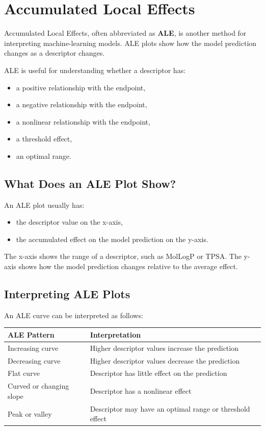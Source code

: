 \documentclass[11pt]{report}
\newenvironment{Important note}{\begin{quote}\color{red}\textbf{Important note:} }{\end{quote}}
\begin{document}
\section{Accumulated Local Effects}

Accumulated Local Effects, often abbreviated as \textbf{ALE}, is another method for interpreting machine-learning models. ALE plots show how the model prediction changes as a descriptor changes.

ALE is useful for understanding whether a descriptor has:

\begin{itemize}[leftmargin=*]
    \item a positive relationship with the endpoint,
    \item a negative relationship with the endpoint,
    \item a nonlinear relationship with the endpoint,
    \item a threshold effect,
    \item an optimal range.
\end{itemize}

\subsection{What Does an ALE Plot Show?}

An ALE plot usually has:

\begin{itemize}[leftmargin=*]
    \item the descriptor value on the x-axis,
    \item the accumulated effect on the model prediction on the y-axis.
\end{itemize}

The x-axis shows the range of a descriptor, such as MolLogP or TPSA. The y-axis shows how the model prediction changes relative to the average effect.

\subsection{Interpreting ALE Plots}

An ALE curve can be interpreted as follows:

\begin{center}
\begin{tabular}{p{}p{}}
\toprule
\textbf{ALE Pattern} & \textbf{Interpretation} \\
\midrule
Increasing curve & Higher descriptor values increase the prediction \\
Decreasing curve & Higher descriptor values decrease the prediction \\
Flat curve & Descriptor has little effect on the prediction \\
Curved or changing slope & Descriptor has a nonlinear effect \\
Peak or valley & Descriptor may have an optimal range or threshold effect \\
\bottomrule
\end{tabular}
\end{center}
\end{document}
